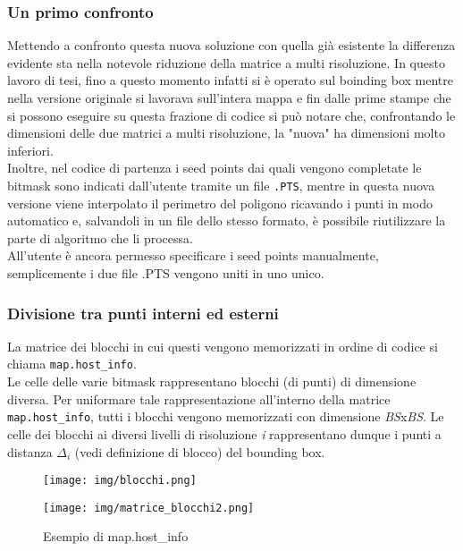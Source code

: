 			\subsubsection{Un primo confronto}
				Mettendo a confronto questa nuova soluzione con quella gi\`{a} esistente la differenza evidente sta nella notevole riduzione della matrice a multi risoluzione. In questo lavoro di tesi, fino a questo momento infatti si \`{e} operato sul boinding box mentre nella versione originale si lavorava sull'intera mappa e fin dalle prime stampe che si possono eseguire su questa frazione di codice si pu\`{o} notare che, confrontando le dimensioni delle due matrici a multi risoluzione, la "nuova" ha dimensioni molto inferiori.\\
				Inoltre, nel codice di partenza i seed points dai quali vengono completate le bitmask sono indicati dall'utente tramite un file \texttt{.PTS}, mentre in questa nuova versione viene interpolato il perimetro del poligono ricavando i punti in modo automatico e, salvandoli in un file dello stesso formato, \`{e} possibile riutilizzare la parte di algoritmo che li processa.\\
				All'utente \`{e} ancora permesso specificare i seed points manualmente, semplicemente i due file .PTS vengono uniti in uno unico.

			\subsubsection{Divisione tra punti interni ed esterni}
				La matrice dei blocchi in cui questi vengono memorizzati in ordine di codice si chiama \texttt{map.host\_info}.\\
				Le celle delle varie bitmask rappresentano  blocchi (di punti) di dimensione diversa. Per uniformare tale rappresentazione all'interno della matrice \texttt{map.host\_info}, tutti i blocchi vengono memorizzati con dimensione \textit{BS}x\textit{BS}. Le celle dei blocchi ai diversi livelli di risoluzione \textit{i} rappresentano dunque i punti a distanza $\Delta_i$ (vedi definizione di blocco) del bounding box.
				\begin{figure}[htbp]
					\centering
					\texttt{[image: img/blocchi.png]}
				\end{figure}
				\begin{figure}[htbp]
					\centering
					\texttt{[image: img/matrice\_blocchi2.png]}
					\caption{Esempio di map.host\_info}
				\end{figure}


